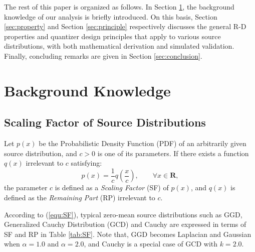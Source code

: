 \documentclass[smallabstract,smallcaptions]{dccpaper}
\begin{document}
The rest of this paper is organized as follows. In Section \ref{sec:background}, the background knowledge of our analysis is briefly introduced. On this basis, Section \ref{sec:property} and Section \ref{sec:principle} respectively discusses the general R-D properties and quantizer design principles that apply to various source distributions, with both mathematical derivation and simulated validation. Finally, concluding remarks are given in Section \ref{sec:conclusion}.

\section{Background Knowledge}
\label{sec:background}

\subsection{Scaling Factor of Source Distributions}

Let $p(x)$ be the Probabilistic Density Function (PDF) of an arbitrarily given source distribution, and $c>0$ is one of its parameters. If there exists a function $q(x)$ irrelevant to $c$ satisfying:
\begin{equation}
\label{equ:SF}
p(x)=\frac{1}{c} q(\frac{x}{c}),\qquad \forall x \in \mathbf{R},
\end{equation}
the parameter $c$ is defined as a \emph{Scaling Factor} (SF) of $p(x)$, and $q(x)$ is defined as the \emph{Remaining Part} (RP) irrelevant to $c$.

According to (\ref{equ:SF}), typical zero-mean source distributions such as GGD, Generalized Cauchy Distribution (GCD) and Cauchy are expressed in terms of SF and RP in Table \ref{tab:SF}. Note that, GGD becomes Laplacian and Gaussian when $\alpha=1.0$ and $\alpha=2.0$, and Cauchy is a special case of GCD with $k=2.0$.
\end{document}
